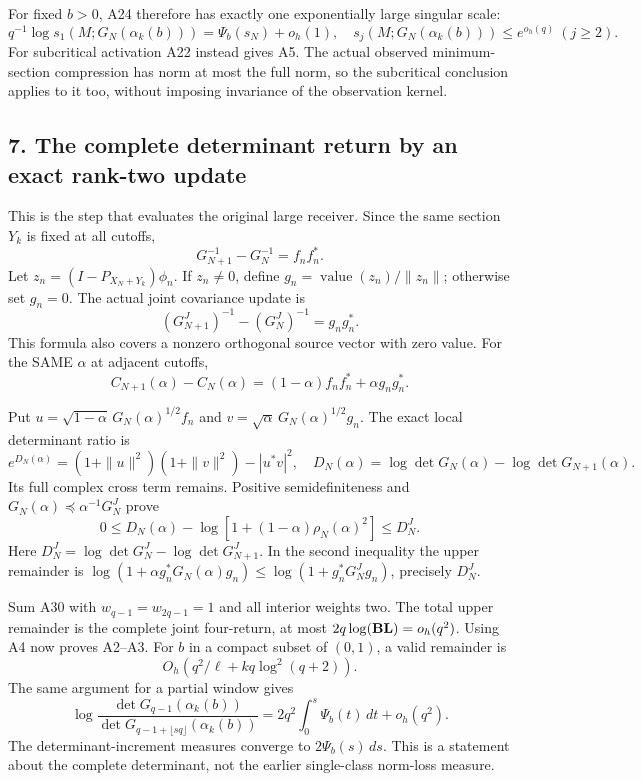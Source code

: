 \documentclass[11pt]{article}
\begin{document}
For fixed \(b>0\), A24 therefore has exactly one exponentially large singular scale: \[
 q^{-1}\log s_1(M;G_N(\alpha_k(b)))=\Psi_b(s_N)+o_h(1),
 \quad s_j(M;G_N(\alpha_k(b)))\le e^{o_h(q)}\ (j\ge2).
 \tag{A27}
\] For subcritical activation A22 instead gives A5. The actual observed minimum-section compression has norm at most the full norm, so the subcritical conclusion applies to it too, without imposing invariance of the observation kernel.

\subsection{7. The complete determinant return by an exact rank-two update}\label{the-complete-determinant-return-by-an-exact-rank-two-update}

This is the step that evaluates the original large receiver. Since the same section \(Y_k\) is fixed at all cutoffs, \[
 G_{N+1}^{-1}-G_N^{-1}=f_nf_n^*.
\] Let \(z_n=(I-P_{X_N+Y_k})\phi_n\). If \(z_n\ne0\), define \(g_n=\operatorname{value}(z_n)/\|z_n\|\); otherwise set \(g_n=0\). The actual joint covariance update is \[
 (G_{N+1}^J)^{-1}-(G_N^J)^{-1}=g_ng_n^*.
\] This formula also covers a nonzero orthogonal source vector with zero value. For the SAME \(\alpha\) at adjacent cutoffs, \[
 C_{N+1}(\alpha)-C_N(\alpha)
  =(1-\alpha)f_nf_n^*+\alpha g_ng_n^*.
 \tag{A28}
\]

Put \(u=\sqrt{1-\alpha}\,G_N(\alpha)^{1/2}f_n\) and \(v=\sqrt\alpha\,G_N(\alpha)^{1/2}g_n\). The exact local determinant ratio is \[
 e^{D_N(\alpha)}
 =(1+\|u\|^2)(1+\|v\|^2)-|u^*v|^2,
 \quad
 D_N(\alpha)=\log\det G_N(\alpha)-\log\det G_{N+1}(\alpha).
 \tag{A29}
\] Its full complex cross term remains. Positive semidefiniteness and \(G_N(\alpha)\preceq\alpha^{-1}G_N^J\) prove \[
 \boxed{
 0\le D_N(\alpha)-\log[1+(1-\alpha)\rho_N(\alpha)^2]
 \le D_N^J.
 }\tag{A30}
\] Here \(D_N^J=\log\det G_N^J-\log\det G_{N+1}^J\). In the second inequality the upper remainder is \(\log(1+\alpha g_n^*G_N(\alpha)g_n)\le
\log(1+g_n^*G_N^Jg_n)\), precisely \(D_N^J\).

Sum A30 with \(w_{q-1}=w_{2q-1}=1\) and all interior weights two. The total upper remainder is the complete joint four-return, at most \(2q\log({\bf B}{\bf L})=o_h(q^2)\). Using A4 now proves A2--A3. For \(b\) in a compact subset of \((0,1)\), a valid remainder is \[
 O_h(q^2/\ell+kq\log^2(q+2)).
 \tag{A31}
\] The same argument for a partial window gives \[
 \log\frac{\det G_{q-1}(\alpha_k(b))}
              {\det G_{q-1+\lfloor sq\rfloor}(\alpha_k(b))}
 =2q^2\int_0^s\Psi_b(t)\,dt+o_h(q^2).
 \tag{A32}
\] The determinant-increment measures converge to \(2\Psi_b(s)\,ds\). This is a statement about the complete determinant, not the earlier single-class norm-loss measure.
\end{document}
